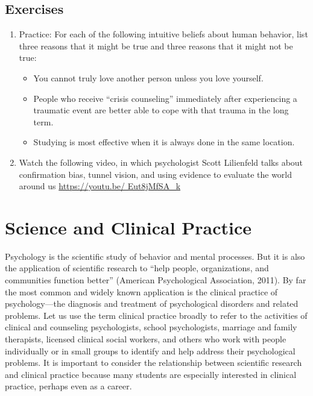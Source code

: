 \documentclass[]{book}
\theoremstyle{definition}
\theoremstyle{definition}
\theoremstyle{remark}
\begin{document}
\subsection{Exercises}\label{exercises-2}

\begin{enumerate}
\def\labelenumi{\arabic{enumi}.}
\item
  Practice: For each of the following intuitive beliefs about human
  behavior, list three reasons that it might be true and three reasons
  that it might not be true:

  \begin{itemize}
  \item
    You cannot truly love another person unless you love yourself.
  \item
    People who receive ``crisis counseling'' immediately after
    experiencing a traumatic event are better able to cope with that
    trauma in the long term.
  \item
    Studying is most effective when it is always done in the same
    location.
  \end{itemize}
\item
  Watch the following video, in which psychologist Scott Lilienfeld
  talks about confirmation bias, tunnel vision, and using evidence to
  evaluate the world around us
  \href{https://youtu.be/\%20Eut8jMfSA_k}{https://youtu.be/
  Eut8jMfSA\_k}
\end{enumerate}

\section{Science and Clinical
Practice}\label{science-and-clinical-practice}

Psychology is the scientific study of behavior and mental processes. But
it is also the application of scientific research to ``help people,
organizations, and communities function better'' (American Psychological
Association, 2011). By far the most common and widely known application
is the clinical practice of psychology---the diagnosis and treatment of
psychological disorders and related problems. Let us use the term
clinical practice broadly to refer to the activities of clinical and
counseling psychologists, school psychologists, marriage and family
therapists, licensed clinical social workers, and others who work with
people individually or in small groups to identify and help address
their psychological problems. It is important to consider the
relationship between scientific research and clinical practice because
many students are especially interested in clinical practice, perhaps
even as a career.
\end{document}

